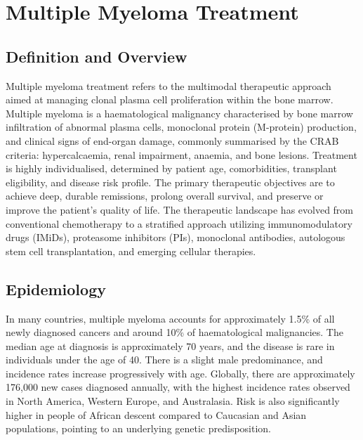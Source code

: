 \chapter{Multiple Myeloma Treatment}

\section*{Definition and Overview}
Multiple myeloma treatment refers to the multimodal therapeutic approach aimed at managing clonal plasma cell proliferation within the bone marrow. Multiple myeloma is a haematological malignancy characterised by bone marrow infiltration of abnormal plasma cells, monoclonal protein (M-protein) production, and clinical signs of end-organ damage, commonly summarised by the CRAB criteria: hypercalcaemia, renal impairment, anaemia, and bone lesions. Treatment is highly individualised, determined by patient age, comorbidities, transplant eligibility, and disease risk profile. The primary therapeutic objectives are to achieve deep, durable remissions, prolong overall survival, and preserve or improve the patient's quality of life. The therapeutic landscape has evolved from conventional chemotherapy to a stratified approach utilizing immunomodulatory drugs (IMiDs), proteasome inhibitors (PIs), monoclonal antibodies, autologous stem cell transplantation, and emerging cellular therapies.

\section*{Epidemiology}
In many countries, multiple myeloma accounts for approximately 1.5\% of all newly diagnosed cancers and around 10\% of haematological malignancies. The median age at diagnosis is approximately 70 years, and the disease is rare in individuals under the age of 40. There is a slight male predominance, and incidence rates increase progressively with age. Globally, there are approximately 176,000 new cases diagnosed annually, with the highest incidence rates observed in North America, Western Europe, and Australasia. Risk is also significantly higher in people of African descent compared to Caucasian and Asian populations, pointing to an underlying genetic predisposition.

